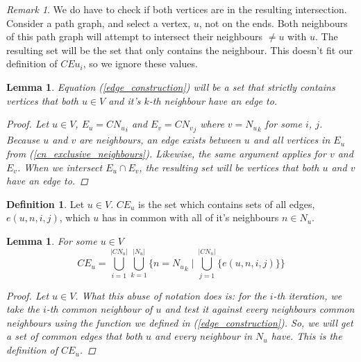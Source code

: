 \documentclass{article}
\theoremstyle{plain}
\newtheorem{lem}[thm]{Lemma}
\theoremstyle{definition}
\newtheorem{defn}{Definition}[]
\theoremstyle{remark}
\newtheorem*{rem}{Remark}
\newcommand{\cn}[1]{ {{CN}_{#1}} }
\newcommand{\ce}[1]{ {{CE}_{#1}} }
\newcommand{\nev}[1]{ {N_{#1}} }
\begin{document}
\begin{rem}
    We do have to check if both vertices are in the resulting intersection. Consider a
    path graph, and select a vertex, \(u\), not on the ends. Both neighbours of this path
    graph will attempt to intersect their neighbours \(\neq u\) with \(u\). The resulting
    set will be the set that only contains the neighbour. This doesn't fit our definition
    of \(CE{u}_i\), so we ignore these values.
\end{rem}

\begin{lem}
    Equation (\ref{edge_construction}) will be a set that strictly contains vertices that
    both \(u \in V\) and it's \(k\)-th neighbour have an edge to.
    \begin{proof}
        Let \(u \in V\), \(E_u = \cn{u}_i\) and \(E_v = \cn{v}_j\) where \(v = \nev{u}_k\)
        for some \(i\), \(j\). Because \(u\) and \(v\) are neighbours, an edge exists
        between \(u\) and all vertices in \(E_u\) from (\ref{cn_exclusive_neighbours}).
        Likewise, the same argument applies for \(v\) and \(E_v\). When we intersect
        \(E_u \cap E_v\), the resulting set will be vertices that both \(u\) and \(v\)
        have an edge to.
    \end{proof}
    \label{unique_edges}
\end{lem}

\begin{defn}
    Let \(u \in V\). \(\ce{u}\) is the set which contains sets of all edges,
    \(e(u, n, i ,j)\), which \(u\) has in common with all of it's neighbours
    \(n \in \nev{u}\).
\end{defn}

\begin{lem}
    For some \(u \in V\)
    \begin{equation}
        \ce{u} = \bigcup_{i=1}^{|\cn{u}|}
            \bigcup_{k=1}^{|\nev{u}|}
                \{ n = \nev{u}_k \mid
                \bigcup_{j=1}^{|\cn{n}|} \{ e(u, n, i, j) \} \}
    \end{equation}
    \begin{proof}
        Let \(u \in V\). What this abuse of notation does is: for the \(i\)-th iteration,
        we take the \(i\)-th common neighbour of \(u\) and test it against every neighbours
        common neighbours using the function we defined in (\ref{edge_construction}). So,
        we will get a set of common edges that both \(u\) and every neighbour in
        \(\nev{u}\) have. This is the definition of \(\ce{u}\).
    \end{proof}
    \label{ce_construct}
\end{lem}
\end{document}
